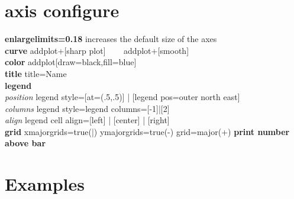 \documentclass[12pt]{article}
\begin{document}

\section{axis configure}
\textbf{enlargelimits=0.18} increases the default size of the axes \\ 
\textbf{curve} addplot+[sharp plot] ~~~ addplot+[smooth]       \\ 
\textbf{color} addplot[draw=black,fill=blue]\\ 
\textbf{title} title=Name\\ 
\textbf{legend} \\ 
\textit{position} legend style={[at={(.5,.5)}] | [legend pos=outer north east]} \\ 
\textit{columns} legend style={legend columns=[-1]|[2]}\\ 
\textit{align} legend cell align=[left] | [center] | [right]\\ 
\textbf{grid} xmajorgrids=true(|) ymajorgrids=true(-) grid=major(+)
\textbf{print number above bar}              

\section{Examples}
\end{document}
